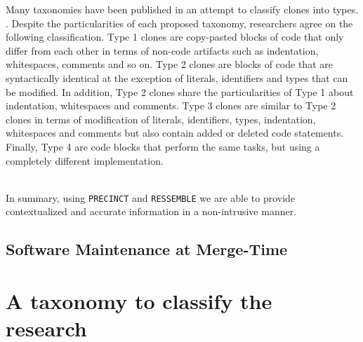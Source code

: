 Many taxonomies have been published in an attempt to classify clones into types. \cite{Mayrand1996,Balazinska1999,Koschke2006,Bellon2007,Kontogiannis,Kapser}.
Despite the particularities of each proposed taxonomy, researchers agree on the following classification.
Type 1 clones are copy-pasted blocks of code that only differ from each other in terms of non-code artifacts such as indentation, whitespaces, comments and so on.
Type 2 clones are blocks of code that are syntactically identical at the exception of literals, identifiers and types that can be modified.
In addition, Type 2 clones share the particularities of Type 1 about indentation, whitespaces and comments.
Type 3 clones are similar to Type 2 clones in terms of modification of literals, identifiers, types, indentation, whitespaces and comments but also contain added or deleted code statements.
Finally, Type 4 are code blocks that perform the same tasks, but using a completely different implementation.




\\

In summary, using {\tt PRECINCT} and {\tt RESSEMBLE} we are able to provide contextualized and accurate information in a non-intrusive manner.

\section{Software Maintenance at Merge-Time}



\chapter{A taxonomy to classify the research\label{chap:taxonomy}}


